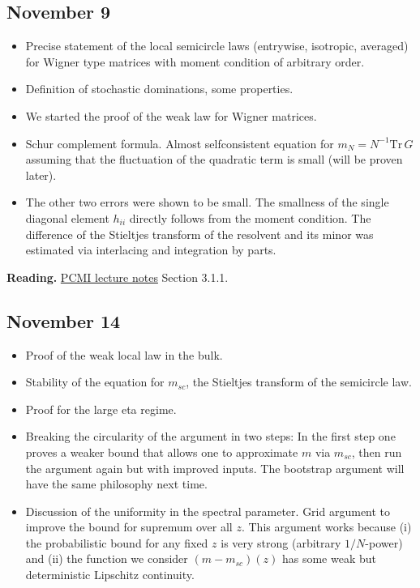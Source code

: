 \documentclass[a4paper]{article}
\begin{document}
\subsection{November 9%
  \label{november-9}%
}

\begin{itemize}
\item Precise statement of the local semicircle laws (entrywise, isotropic, averaged) for Wigner type matrices with moment condition of arbitrary order.

\item Definition of stochastic dominations, some properties.

\item We started the proof of the weak law for Wigner matrices.

\item Schur complement formula. Almost selfconsistent equation for $m_N = N^{-1} \text{Tr}\, G$ assuming that the fluctuation of the quadratic term is small (will be proven later).

\item The other two errors were shown to be small. The smallness of the single diagonal element $h_{ii}$ directly follows from the moment condition. The difference of the Stieltjes transform of the resolvent and its minor was estimated via interlacing and integration by parts.
\end{itemize}

\textbf{Reading.} \href{pcmi.pdf}{PCMI lecture notes} Section 3.1.1.


\subsection{November 14%
  \label{november-14}%
}

\begin{itemize}
\item Proof of the weak local law in the bulk.

\item Stability of the equation for $m_{sc}$, the Stieltjes transform of the semicircle law.

\item Proof for the large eta regime.

\item Breaking the circularity of the argument in two steps: In the first step one proves a weaker bound that allows one to approximate $m$ via $m_{sc}$, then run the argument again but with improved inputs. The bootstrap argument will have the same philosophy next time.

\item Discussion of the uniformity in the spectral parameter. Grid argument to improve the bound for supremum over all $z$. This argument works because (i) the probabilistic bound for any fixed $z$ is very strong (arbitrary $1/N$-power) and (ii) the function we consider $(m-m_{sc})(z)$ has some weak but deterministic Lipschitz continuity.
\end{itemize}
\end{document}
